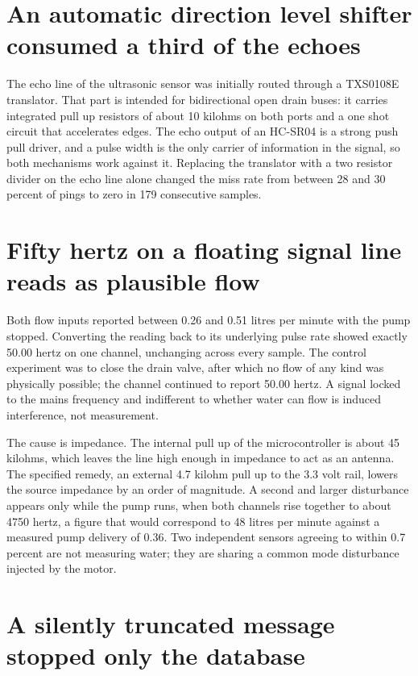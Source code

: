 \section{An automatic direction level shifter consumed a third of the echoes}

The echo line of the ultrasonic sensor was initially routed through a TXS0108E translator. That part is intended for bidirectional open drain buses: it carries integrated pull up resistors of about 10 kilohms on both ports and a one shot circuit that accelerates edges. The echo output of an HC-SR04 is a strong push pull driver, and a pulse width is the only carrier of information in the signal, so both mechanisms work against it. Replacing the translator with a two resistor divider on the echo line alone changed the miss rate from between 28 and 30 percent of pings to zero in 179 consecutive samples.

\section{Fifty hertz on a floating signal line reads as plausible flow}

Both flow inputs reported between 0.26 and 0.51 litres per minute with the pump stopped. Converting the reading back to its underlying pulse rate showed exactly 50.00 hertz on one channel, unchanging across every sample. The control experiment was to close the drain valve, after which no flow of any kind was physically possible; the channel continued to report 50.00 hertz. A signal locked to the mains frequency and indifferent to whether water can flow is induced interference, not measurement.

The cause is impedance. The internal pull up of the microcontroller is about 45 kilohms, which leaves the line high enough in impedance to act as an antenna. The specified remedy, an external 4.7 kilohm pull up to the 3.3 volt rail, lowers the source impedance by an order of magnitude. A second and larger disturbance appears only while the pump runs, when both channels rise together to about 4750 hertz, a figure that would correspond to 48 litres per minute against a measured pump delivery of 0.36. Two independent sensors agreeing to within 0.7 percent are not measuring water; they are sharing a common mode disturbance injected by the motor.

\section{A silently truncated message stopped only the database}

